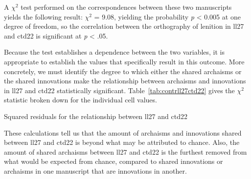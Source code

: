 
A \(\chi^2\) test performed on the correspondences between these two manuscripts yields the following result: \(\chi^2\) = 9.08, yielding the probability \emph{p} < 0.005 at one degree of freedom, so the correlation between the orthography of lenition in \gls{ll27} and \gls{ctd22} is  significant at \textit{p} < .05.

Because the test establishes a dependence between the two variables, it is appropriate to establish the values that specifically result in  this outcome. More concretely, we must identify the degree to which either the shared archaisms or the shared innovations  make the relationship between archaisms and innovations in \gls{ll27} and \gls{ctd22} statistically significant. Table~\ref{tab:contrll27ctd22} gives the \(\chi^2\) statistic broken down for the individual cell values.

\begin{table}[h]
  \centering
  \caption{Squared residuals for the relationship between \acrshort{ll27} and \acrshort{ctd22}}
  \label{tab:contrll27ctd22}
  
\end{table}

These calculations tell us that the amount of archaisms and innovations shared between \gls{ll27} and \gls{ctd22} is beyond what may be attributed to chance. Also, the amount of shared archaisms between \gls{ll27} and \gls{ctd22} is the furthest removed from what would be expected from chance, compared to shared innovations or archaisms in one manuscript that are innovations in another.

